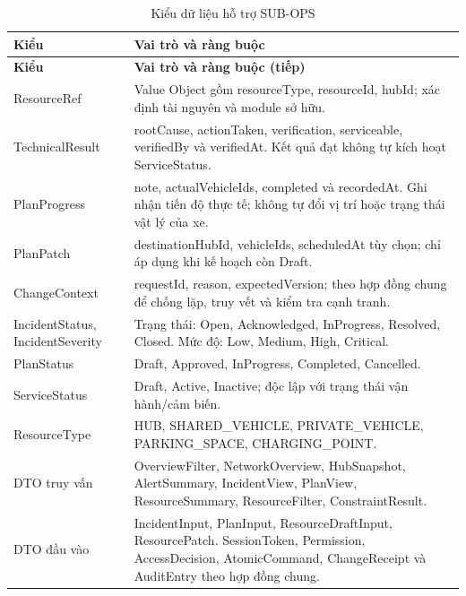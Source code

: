 \begin{longtable}{|L{37mm}|L{102mm}|}
\caption{Kiểu dữ liệu hỗ trợ SUB-OPS}\\\hline
\textbf{Kiểu} & \textbf{Vai trò và ràng buộc}\\\hline
\endfirsthead
\hline\textbf{Kiểu} & \textbf{Vai trò và ràng buộc (tiếp)}\\\hline\endhead
ResourceRef & Value Object gồm resourceType, resourceId, hubId; xác định tài nguyên và module sở hữu.\\\hline
TechnicalResult & rootCause, actionTaken, verification, serviceable, verifiedBy và verifiedAt. Kết quả đạt không tự kích hoạt ServiceStatus.\\\hline
PlanProgress & note, actualVehicleIds, completed và recordedAt. Ghi nhận tiến độ thực tế; không tự đổi vị trí hoặc trạng thái vật lý của xe.\\\hline
PlanPatch & destinationHubId, vehicleIds, scheduledAt tùy chọn; chỉ áp dụng khi kế hoạch còn Draft.\\\hline
ChangeContext & requestId, reason, expectedVersion; theo hợp đồng chung để chống lặp, truy vết và kiểm tra cạnh tranh.\\\hline
IncidentStatus, IncidentSeverity & Trạng thái: Open, Acknowledged, InProgress, Resolved, Closed. Mức độ: Low, Medium, High, Critical.\\\hline
PlanStatus & Draft, Approved, InProgress, Completed, Cancelled.\\\hline
ServiceStatus & Draft, Active, Inactive; độc lập với trạng thái vận hành/cảm biến.\\\hline
ResourceType & HUB, SHARED\_VEHICLE, PRIVATE\_VEHICLE, PARKING\_SPACE, CHARGING\_POINT.\\\hline
DTO truy vấn & OverviewFilter, NetworkOverview, HubSnapshot, AlertSummary, IncidentView, PlanView, ResourceSummary, ResourceFilter, ConstraintResult.\\\hline
DTO đầu vào & IncidentInput, PlanInput, ResourceDraftInput, ResourcePatch. SessionToken, Permission, AccessDecision, AtomicCommand, ChangeReceipt và AuditEntry theo hợp đồng chung.\\\hline
\end{longtable}

